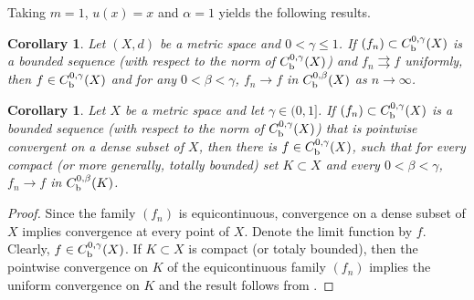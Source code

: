 \documentclass[intlimits,12pt,reqno]{amsart}
\numberwithin{equation}{section}
\newtheorem{corollary}[theorem]{Corollary}
\theoremstyle{definition}
\begin{document}
Taking $m=1$, $u(x)=x$ and $\alpha=1$ yields the following results.
\begin{corollary}
\label{T70}
Let $(X,d)$ be a metric space and $0<\gamma\leq 1$. If $(f_n)\subset C_{\rm b}^{0,\gamma}(X)$ is a bounded sequence (with respect to the norm of $C^{0,\gamma}_{\rm b}(X)$) and $f_n\rightrightarrows f$ uniformly, then $f\in C_{\rm b}^{0,\gamma}(X)$ and for any $0<\beta<\gamma$, $f_n\to f$ in $C_{\rm b}^{0,\beta}(X)$ as $n\to\infty$.
\end{corollary}
\begin{corollary}
\label{T77}
Let $X$ be a metric space and let $\gamma\in (0,1]$. If $(f_n)\subset C_{\rm b}^{0,\gamma}(X)$ is a bounded sequence (with respect to the norm of $C_{\rm b}^{0,\gamma}(X)$) that is pointwise convergent on a dense subset of $X$, then there is $f\in C_{\rm b}^{0,\gamma}(X)$, such that for every compact (or more generally, totally bounded) set $K\subset X$ and every $0<\beta<\gamma$, $f_n\to f$ in $C^{0,\beta}_{\rm b}(K)$.
\end{corollary}
\begin{proof}
Since the family $(f_n)$ is equicontinuous, convergence on a dense subset of $X$ implies convergence at every point of $X$. Denote the limit function by $f$. Clearly, $f\in C_{\rm b}^{0,\gamma}(X)$. If $K\subset X$ is compact (or totaly bounded), then the pointwise convergence on $K$ of the equicontinuous family $(f_n)$ implies the uniform convergence on $K$ and the result follows from .
\end{proof}
\end{document}
